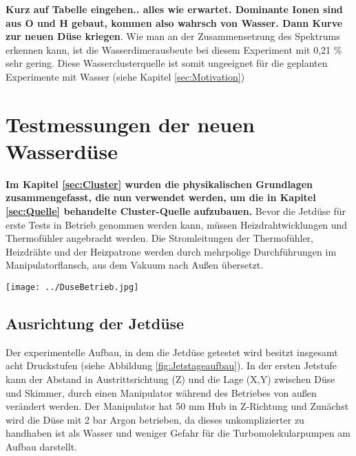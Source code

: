 \textbf{Kurz auf Tabelle eingehen.. alles wie erwartet. Dominante Ionen sind aus O und H gebaut, kommen also wahrsch von Wasser. Dann Kurve zur neuen Düse kriegen}.
Wie man an der Zusammensetzung des Spektrums erkennen kann, ist die Wasserdimerausbeute bei diesem Experiment mit 0,21 \% sehr gering. Diese Wasserclusterquelle ist somit ungeeignet für die geplanten Experimente mit Wasser (siehe Kapitel \ref{sec:Motivation})

\section{Testmessungen der neuen Wasserdüse}

\textbf{Im Kapitel \ref{sec:Cluster} wurden die physikalischen Grundlagen zusammengefasst, die nun verwendet werden, um die in Kapitel \ref{sec:Quelle} \textbf{behandelte} Cluster-Quelle aufzubauen.}
Bevor die Jetdüse für erste Tests in Betrieb genommen werden kann, müssen Heizdrahtwicklungen und Thermofühler angebracht werden. Die Stromleitungen der Thermofühler, Heizdrähte und der Heizpatrone werden durch mehrpolige Durchführungen im Manipulatorflansch, aus dem Vakuum nach Außen übersetzt. 

\begin{center}
\begin{minipage}{\linewidth}
\centering
\texttt{[image: ../DuseBetrieb.jpg]}%
 \label{fig:DuseBetrieb}
\end{minipage} 
\end{center} 

\subsection{Ausrichtung der Jetdüse} \label{sec:Ausrichtung der Jetduse}

Der experimentelle Aufbau, in dem die Jetdüse getestet wird besitzt insgesamt acht Druckstufen (siehe Abbildung \ref{fig:Jetstageaufbau}). In der ersten Jetstufe kann der Abstand in Austrittsrichtung (Z) und die Lage (X,Y) zwischen Düse und Skimmer, durch einen Manipulator während des Betriebes von außen verändert werden. Der Manipulator hat 50 mm Hub in Z-Richtung und  Zunächst wird die Düse mit 2 bar Argon betrieben, da dieses unkomplizierter zu handhaben ist als Wasser und weniger Gefahr für die Turbomolekularpumpen am Aufbau darstellt. 

